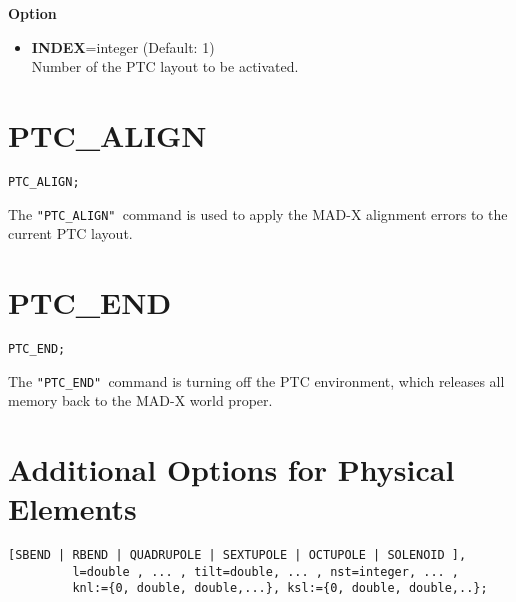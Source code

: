 {\bf Option} \\
\begin{itemize}
   \item {\bf INDEX}=integer (Default: 1) \\
     Number of the PTC layout to be activated.
\end{itemize}

\section{PTC\_ALIGN}

\begin{verbatim}
PTC_ALIGN;
\end{verbatim}

The \texttt{"PTC\_ALIGN" }command is used to apply the MAD-X alignment
errors to the current PTC layout.  

\section{PTC\_END}

\begin{verbatim}
PTC_END;
\end{verbatim}

The \texttt{"PTC\_END" }command  is turning off the PTC environment,
which releases all memory back to the MAD-X world proper.


\section{Additional Options for Physical Elements}
\label{sec:add_option_PTC}

\begin{verbatim}
[SBEND | RBEND | QUADRUPOLE | SEXTUPOLE | OCTUPOLE | SOLENOID ],
         l=double , ... , tilt=double, ... , nst=integer, ... ,
         knl:={0, double, double,...}, ksl:={0, double, double,..}; 
\end{verbatim}


